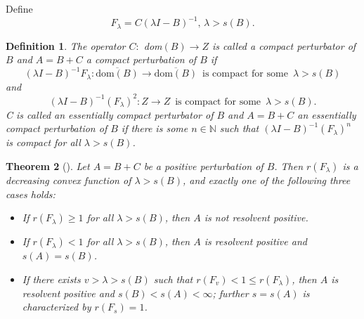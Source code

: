 \documentclass[11pt,reqno]{amsart}
\newtheorem{theorem}{Theorem}[section]
\newtheorem{definition}[theorem]{Definition}
\numberwithin{equation}{section}
\begin{document}
Define
$$
F_{\lambda} = C(\lambda I - B)^{-1}, \, \lambda > s(B).
$$
\begin{definition}{\rm
The operator $C :$ dom$(B) \to Z$ is called a compact perturbator of $B$ and $A = B+C$ a compact perturbation of $B$ if
\begin{equation*}
(\lambda I - B)^{-1} F_{\lambda} :
\overline{\text{dom}(B)} \to \overline{\text{dom}(B)}
\enspace\text{is compact for some}\enspace \lambda>s(B)
\end{equation*}
and
\begin{equation*}
(\lambda I - B)^{-1} (F_{\lambda})^{2} :
Z \to Z
\enspace\text{is compact for some}\enspace \lambda>s(B).
\end{equation*}
C is called an essentially compact perturbator of $B$ and $A = B + C$ an essentially compact perturbation of $B$ if there is some $n \in \mathbb{N}$ such that $(\lambda I - B)^{-1}(F_{\lambda})^{n} $ is compact for all $\lambda>s(B)$.
}
\end{definition}

\begin{theorem}[{\cite[Theorem 3.6]{Th2}}]\label{THM2.4}
Let $A=B+C$ be a positive perturbation of $B$.
Then $r(F_{\lambda})$ is a decreasing convex function of $\lambda>s(B)$, and exactly one of the following three cases holds:
\begin{itemize}[leftmargin=1cm]
\item[$(i)$] If $r(F_{\lambda})\geq 1$ for all $\lambda>s(B)$, then $A$ is not resolvent positive.

\item[$(ii)$] If $r(F_{\lambda})< 1$ for all $\lambda>s(B)$, then $A$ is resolvent positive and $s(A) = s(B)$.

\item[$(iii)$] If there exists $v>\lambda>s(B)$ such that $r(F_{v})<1\leq r(F_{\lambda})$, then $A$ is resolvent positive and $s(B)<s(A)<\infty$; further $s=s(A)$ is characterized by $r(F_{s})=1$.
\end{itemize}
\end{theorem}
\end{document}
